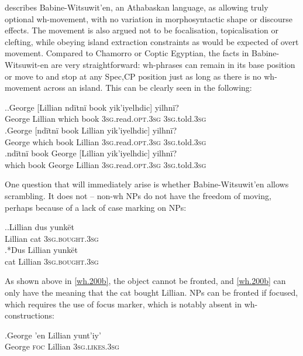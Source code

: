\documentclass[11pt]{article}
\begin{document}
\cite{denham:1997,denham:2000} describes Babine-Witsuwit'en, an Athabaskan language, as allowing truly optional wh-movement, with no variation in morphosyntactic shape or discourse effects. The movement is also argued not to be focalisation, topicalisation or clefting, while obeying island extraction constraints as would be expected of overt movement. Compared to Chamorro or Coptic Egyptian, the facts in Babine-Witsuwit-en are very straightforward: wh-phrases can remain in its base position or move to and stop at any Spec,CP position just as long as there is no wh-movement across an island. This can be clearly seen in the following:

\ex.\ag.\label{wh.190a}George [Lillian nd\"itn\"i book yik'iyelhdic] yilhn\"i?\\
   George Lillian which book \textsc{3sg}.read.\textsc{opt.3sg} \textsc{3sg}.told.\textsc{3sg}\\
   \bg.\label{wh.190b}George [nd\"itn\"i book Lillian yik'iyelhdic] yilhn\"i?\\
   George which book Lillian \textsc{3sg}.read.\textsc{opt.3sg} \textsc{3sg}.told.\textsc{3sg}\\
   \bg.\label{wh.190c}nd\"itn\"i book George [Lillian yik'iyelhdic] yilhn\"i?\\
   which book George Lillian \textsc{3sg}.read.\textsc{opt.3sg} \textsc{3sg}.told.\textsc{3sg}\\

One question that will immediately arise is whether Babine-Witsuwit'en allows scrambling. It does not -- non-wh NPs do not have the freedom of moving, perhaps because of a lack of case marking on NPs:

\ex.\ag.\label{wh.200a}Lillian dus yunk\"et\\
   Lillian cat \textsc{3sg.bought.3sg}\\
   \bg.*\label{wh.200b}Dus Lillian yunk\"et\\
   cat Lillian \textsc{3sg.bought.3sg}\\

As shown above in \ref{wh.200b}, the object cannot be fronted, and \ref{wh.200b} can only have the meaning that the cat bought Lillian. NPs can be fronted if focused, which requires the use of focus marker, which is notably absent in wh-constructions:

\exg.\label{wh.210}George 'en Lillian yunt'iy'\\
   George \textsc{foc} Lillian \textsc{3sg.likes.3sg}\\
\end{document}
